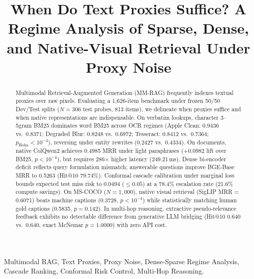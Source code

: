 \documentclass[conference]{IEEEtran}
\begin{document}
\title{When Do Text Proxies Suffice? A Regime Analysis of Sparse, Dense, and Native-Visual Retrieval Under Proxy Noise}

\author{
}

\maketitle

\begin{abstract}
Multimodal Retrieval-Augmented Generation (MM-RAG) frequently indexes textual proxies over raw pixels. Evaluating a 1,626-item benchmark under frozen 50/50 Dev/Test splits ($N=306$ test probes, 813 items), we delineate when proxies suffice and when native representations are indispensable. On verbatim lookups, character 3--5gram BM25 dominates word BM25 across OCR regimes (Apple Clean: 0.9436 vs.\ 0.8371; Degraded Blur: 0.8248 vs.\ 0.6972; Tesseract: 0.8412 vs.\ 0.7364; $p_{\text{Holm}} < 10^{-4}$), reversing under entity rewrites (0.2427 vs.\ 0.4334). On documents, native ColQwen2 achieves 0.4985 MRR under light paraphrases (+0.0982 lift over BM25, $p < 10^{-4}$), but requires 286$\times$ higher latency (249.21\,ms). Dense bi-encoder deficit reflects query formulation mismatch; answerable questions improve BGE-Base MRR to 0.5263 (Hit@10 79.74\%). Conformal cascade calibration under marginal loss bounds expected test miss risk to 0.0494 ($\le 0.05$) at a 78.4\% escalation rate (21.6\% compute savings). On MS-COCO ($N=1{,}000$), native visual retrieval (SigLIP MRR = 0.6071) beats machine captions (0.3728, $p < 10^{-4}$) while statistically matching human gold captions (0.5835, $p=0.142$). In multi-hop reasoning, extractive pseudo-relevance feedback exhibits no detectable difference from generative LLM bridging (Hit@10 0.640 vs.\ 0.640, exact McNemar $p = 1.0000$) with zero API cost.
\end{abstract}

\begin{IEEEkeywords}
Multimodal RAG, Text Proxies, Proxy Noise, Dense-Sparse Regime Analysis, Cascade Ranking, Conformal Risk Control, Multi-Hop Reasoning.
\end{IEEEkeywords}
\end{document}
